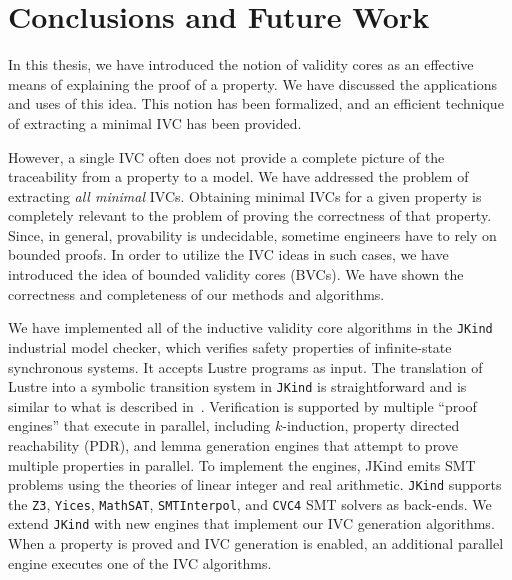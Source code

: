 \chapter{Conclusions and Future Work}
\label{ch:con}
In this thesis, we have introduced the notion of validity cores as an effective means of explaining the proof of a property. We have discussed the applications and uses of this idea.
This notion has been formalized, and an efficient technique of extracting a minimal IVC has been provided.  

However, a single IVC often does not provide a complete picture of the traceability from a property to a model.  We have addressed the problem of extracting {\em all minimal} IVCs. Obtaining minimal IVCs for a given property is completely relevant to the problem of proving the correctness of that property. 
Since, in general, provability is undecidable, sometime engineers have to rely on bounded proofs. In order to utilize the IVC ideas in such cases, we have introduced the idea of bounded validity cores (BVCs).
We have shown
the correctness and completeness of our methods and algorithms.

We have implemented all of the inductive validity core algorithms in the \texttt{JKind} ~\cite{jkind} industrial model checker,
which verifies safety properties of infinite-state synchronous systems.
It accepts Lustre programs \cite{Halbwachs91:lustre} as input.  The translation of Lustre
into a symbolic transition system in \texttt{JKind} is straightforward and is similar to what is described
in~\cite{Hagen08:FMCAD}.
Verification is supported by multiple ``proof engines'' that execute in parallel, including $k$-induction,
property directed reachability (PDR), and lemma generation engines that attempt to prove
multiple properties in parallel.  To implement the engines,
JKind emits SMT problems using the theories of linear integer and real arithmetic. \texttt{JKind} supports the \texttt{Z3}, \texttt{Yices}, \texttt{MathSAT}, \texttt{SMTInterpol}, and \texttt{CVC4} SMT solvers as back-ends.  We extend \texttt{JKind} with new engines that implement our IVC generation algorithms. When a property is
proved and IVC generation is enabled, an additional parallel engine
executes one of the IVC algorithms.


